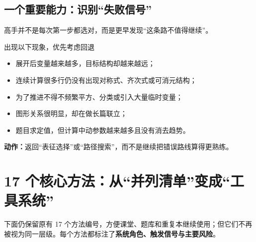 \documentclass[11pt,a4paper]{ctexart}
\begin{document}
\subsection{一个重要能力：识别“失败信号”}
高手并不是每次第一步都选对，而是更早发现“这条路不值得继续”。

\begin{trainingbox}{出现以下现象，优先考虑回退}
\begin{itemize}
  \item 展开后变量越来越多，目标结构却越来越远；
  \item 连续计算很多行仍没有出现对称式、齐次式或可消元结构；
  \item 为了推进不得不频繁平方、分类或引入大量临时变量；
  \item 图形关系很明显，却在做长篇联立；
  \item 题目求定值，但计算中动参数越来越多且没有消去趋势。
\end{itemize}
\textbf{动作：}返回“表征选择”或“路径搜索”，而不是继续把错误路线算得更熟练。
\end{trainingbox}

\newpage

\section{17 个核心方法：从“并列清单”变成“工具系统”}

下面仍保留原有 17 个方法编号，方便课堂、题库和重复本继续使用；但它们不再被视为同一层级。每个方法都标注了\textbf{系统角色、触发信号与主要风险}。
\end{document}
